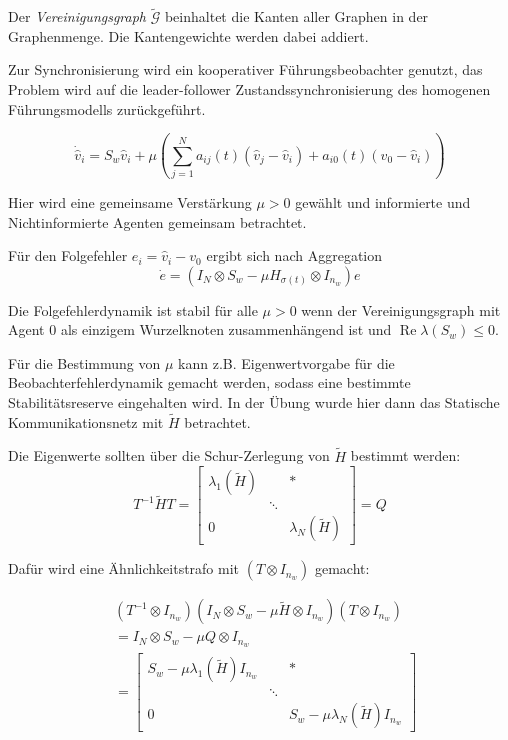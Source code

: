 Der \emph{Vereinigungsgraph} $\tilde{\mathcal{G}}$ beinhaltet die Kanten
aller Graphen in der Graphenmenge.
Die Kantengewichte werden dabei addiert.

Zur Synchronisierung wird ein kooperativer Führungsbeobachter genutzt,
das Problem wird auf die leader-follower Zustandssynchronisierung
des homogenen Führungsmodells zurückgeführt.

\begin{equation}
    \dot{\hat{v}}_i = S_w \hat{v}_i + \mu \left( \sum_{j=1}^N a_{ij}(t)
    (\hat{v}_j - \hat{v}_i) + a_{i0}(t)(v_0 - \hat{v}_i) \right)   
\end{equation}

Hier wird eine gemeinsame Verstärkung $\mu >0$ gewählt und informierte
und Nichtinformierte Agenten gemeinsam betrachtet.

Für den Folgefehler $e_i = \hat{v}_i - v_0$ ergibt sich nach Aggregation
\begin{equation}
    \dot{e} = (I_N \otimes S_w - \mu H_{\sigma(t)} \otimes I_{n_w}) e
\end{equation}

Die Folgefehlerdynamik ist stabil für alle $\mu > 0$ wenn der Vereinigungsgraph
mit Agent 0 als einzigem Wurzelknoten zusammenhängend ist und
$\operatorname{Re}\lambda(S_w) \leq 0$.

Für die Bestimmung von $\mu$ kann z.B. Eigenwertvorgabe für die
Beobachterfehlerdynamik gemacht werden, sodass eine bestimmte
Stabilitätsreserve eingehalten wird.
In der Übung wurde hier dann das Statische Kommunikationsnetz
mit $\tilde{H}$ betrachtet.

Die Eigenwerte sollten über die Schur-Zerlegung von $\tilde{H}$
bestimmt werden:
\begin{equation}
    T^{-1}\tilde{H}T = \begin{bmatrix}
        \lambda_1(\tilde{H}) & &* \\
        & \ddots & \\
        0 & & \lambda_N(\tilde{H})
    \end{bmatrix}=Q
\end{equation}

Dafür wird eine Ähnlichkeitstrafo mit $(T\otimes I_{n_w})$ gemacht:

\begin{align}
    &(T^{-1} \otimes I_{n_w})(I_N \otimes S_w - \mu \tilde{H} \otimes I_{n_w})(T\otimes I_{n_w}) \\
    &= I_N \otimes S_w - \mu Q \otimes I_{n_w} \\
    &= \begin{bmatrix}
        S_w - \mu \lambda_1(\tilde{H}) I_{n_w} & &*\\
        & \ddots & \\
        0 & & S_w - \mu \lambda_N(\tilde{H}) I_{n_w}
    \end{bmatrix}
\end{align}

